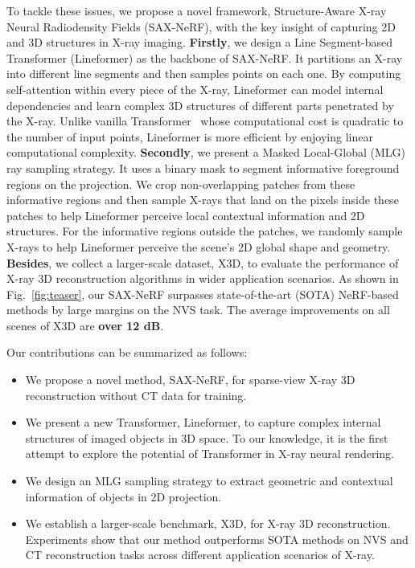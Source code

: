 \documentclass[10pt,twocolumn,letterpaper]{article}
\begin{document}
To tackle these issues, we propose a novel framework, Structure-Aware X-ray Neural Radiodensity Fields (SAX-NeRF), with the key insight of capturing 2D and 3D structures in X-ray imaging. \textbf{Firstly}, we design a Line Segment-based Transformer (Lineformer) as the backbone of SAX-NeRF. It partitions an X-ray into different line segments and then samples points on each one. By computing self-attention within every piece of the X-ray, Lineformer can model internal dependencies and learn complex 3D structures of different parts penetrated by the X-ray. Unlike vanilla Transformer~\cite{vaswani2017attention} whose computational cost is quadratic to the number of input points, Lineformer is more efficient by enjoying linear computational complexity. \textbf{Secondly}, we present a Masked Local-Global (MLG) ray sampling strategy. It uses a binary mask to segment informative foreground regions on the projection. We crop non-overlapping patches from these informative regions and then sample X-rays that land on the pixels inside these patches to help Lineformer perceive local contextual information and 2D structures. For the informative regions outside the patches, we randomly sample X-rays to help Lineformer perceive the scene's 2D global shape and geometry. \textbf{Besides}, we collect a larger-scale dataset, X3D, to evaluate the performance of X-ray 3D reconstruction algorithms in wider application scenarios. As shown in Fig.~\ref{fig:teaser}, our SAX-NeRF surpasses state-of-the-art (SOTA) NeRF-based methods by large margins on the NVS task. The average improvements on all scenes of X3D are \textbf{over 12 dB}. 



Our contributions can be summarized as follows:
\begin{itemize}
	\vspace{0.5mm}
	\item We propose a novel method, SAX-NeRF, for sparse-view X-ray 3D reconstruction without CT data for training.
	\vspace{0.5mm}
	\item We present a new Transformer, Lineformer, to capture complex internal structures of imaged objects in 3D space. To our knowledge, it is the first attempt to explore the potential of Transformer in X-ray neural rendering.
	\vspace{0.5mm}
	\item We design an MLG sampling strategy to extract geometric and contextual information of objects in 2D projection.
	\vspace{-3.3mm}
	\item We establish a larger-scale benchmark, X3D, for X-ray 3D reconstruction. Experiments show that our method outperforms SOTA methods on NVS and CT reconstruction tasks across different application scenarios of X-ray.
\end{itemize}
\end{document}
